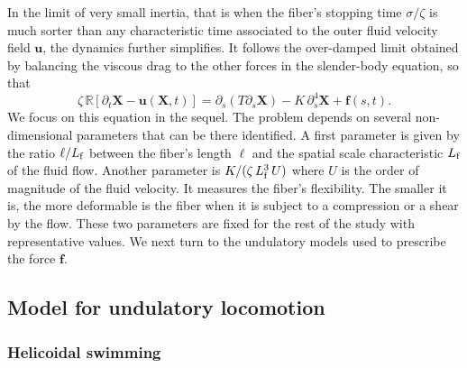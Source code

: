 \documentclass[aps,prl,preprint,groupedaddress]{revtex4-2}
\newcommand{\bX}{\bm X}
\newcommand{\bu}{\bm u}
\newcommand{\bF}{\bm f}
\begin{document}
In the limit of very small inertia, that is when the fiber's stopping time $\sigma/\zeta$ is much sorter than any characteristic time associated to the outer fluid velocity field $\bu$, the dynamics further simplifies. It follows the over-damped limit obtained by balancing the viscous drag to the other forces in the slender-body equation, so that
\begin{equation}
  \zeta\,\mathbb{R}\left[\partial_t \bX-\bu(\bX,t)\right] = \partial_s(T\partial_s \bX) - K\,\partial_s^4 \bX + \bF(s,t).
  \label{eq:vel_fib}
\end{equation}
We focus on this equation in the sequel.
The problem depends on several non-dimensional parameters that can be there identified. A first parameter is given by the ratio $\ell/L_{\rm f}$ between the fiber's length $\ell$ and the spatial scale characteristic $L_{\rm f}$ of the fluid flow. Another parameter is ${K}/({\zeta\,L_{\rm f}^{3}\,U})$ where $U$ is the order of magnitude of the fluid velocity. It measures the fiber's flexibility. The smaller it is, the more deformable is the fiber when it is subject to a compression or a shear by the flow. These two parameters are fixed for the rest of the study with representative values. We next turn to the undulatory models used to prescribe the force $\bF$.


\subsection{Model for undulatory locomotion}

\subsubsection{Helicoidal swimming}
\end{document}
